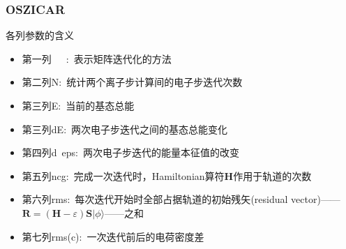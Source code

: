 \frame
{
	\frametitle{\textrm{OSZICAR}}
	各列参数的含义
\begin{itemize}
	\item 第一列~~~:~表示矩阵迭代化的方法
	\item 第二列\textrm{N}:~统计两个离子步计算间的电子步迭代次数
	\item 第三列\textrm{E}:~当前的基态总能
	\item 第三列\textrm{dE}:~两次电子步迭代之间的基态总能变化
	\item 第四列\textrm{d~eps}:~两次电子步迭代的能量本征值的改变%
	\item 第五列\textrm{ncg}:~完成一次迭代时，\textrm{Hamiltonian}算符\textbf{H}作用于轨道的次数~
	\item 第六列\textrm{rms}:~每次迭代开始时全部占据轨道的初始残矢\textrm{(residual vector)}——$\mathbf{R}=(\mathbf{H}-\varepsilon)\mathbf{S}|\phi\rangle$——之和\\{\fontsize{7.0pt}{5.2pt}\selectfont{该值表明轨道的收敛情形的优劣}}
	\item 第七列\textrm{rms(c)}:~一次迭代前后的电荷密度差
\end{itemize}
}

